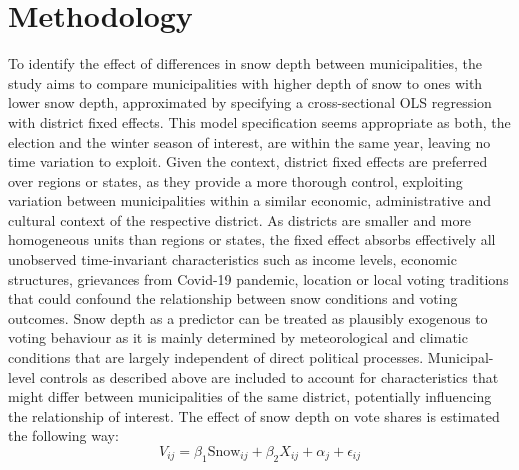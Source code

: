 \documentclass{article}
\begin{document}
\vspace{2em}

\section{Methodology}

To identify the effect of differences in snow depth between municipalities, the study aims to compare municipalities with higher depth of snow to ones with lower snow depth, approximated by specifying a cross-sectional OLS regression with district fixed effects. This model specification seems appropriate as both, the election and the winter season of interest, are within the same year, leaving no time variation to exploit. Given the context, district fixed effects are preferred over regions or states, as they provide a more thorough control, exploiting variation between municipalities within a similar economic, administrative and cultural context of the respective district. As districts are smaller and more homogeneous units than regions or states, the fixed effect absorbs effectively all unobserved time-invariant characteristics such as income levels, economic structures, grievances from Covid-19 pandemic, location or local voting traditions that could confound the relationship between snow conditions and voting outcomes. Snow depth as a predictor can be treated as plausibly exogenous to voting behaviour as it is mainly determined by meteorological and climatic conditions that are largely independent of direct political processes. 
Municipal-level controls as described above are included to account for characteristics that might differ between municipalities of the same district, potentially influencing the relationship of interest. The effect of snow depth on vote shares is estimated the following way: 
\vspace{1em}
\begin{equation*}
V_{ij} = \beta_1 \text{Snow}_{ij} + \beta_2 X_{ij} + \alpha_j + \epsilon_{ij}
\end{equation*}
\end{document}
